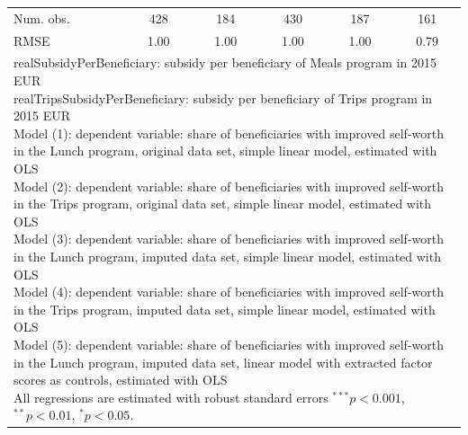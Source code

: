 \begin{frame}[fragile]
\begin{table}
\begin{center}
{\begin{tabular}{l c c c c c }
Num. obs.                      & 428      & 184      & 430      & 187      & 161          \\
RMSE                           & 1.00     & 1.00     & 1.00     & 1.00     & 0.79         \\
\hline
\multicolumn{6}{l}{\scriptsize{\parbox{\linewidth}
{\vspace{2pt} realSubsidyPerBeneficiary: subsidy per beneficiary of Meals program in 2015 EUR \\ realTripsSubsidyPerBeneficiary: subsidy per beneficiary of Trips program in 2015 EUR \\Model (1): dependent variable: share of beneficiaries with improved self-worth in the Lunch program, original data set, simple linear model, estimated with OLS \\ Model (2): dependent variable: share of beneficiaries with improved self-worth in the Trips program, original data set, simple linear model, estimated with OLS \\ Model (3): dependent variable: share of beneficiaries with improved self-worth in the Lunch program, imputed data set, simple linear model, estimated with OLS \\ Model (4): dependent variable: share of beneficiaries with improved self-worth in the Trips program, imputed data set, simple linear model, estimated with OLS \\ Model (5): dependent variable: share of beneficiaries with improved self-worth in the Lunch program, imputed data set, linear model with extracted factor scores as controls, estimated with OLS \\ All regressions are estimated with robust standard errors $^{***}p<0.001$, $^{**}p<0.01$, $^*p<0.05$.}}}
\end{tabular}
}
\label{SelfworthRegressions}
\end{center}
\end{table}


\end{frame}

